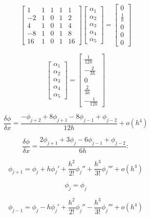 \documentclass[12pt,a4paper]{report}
\begin{document}
\begin{enumerate}
$$\begin{bmatrix}
1 & 1 & 1 & 1 & 1 \\
-2 & 1 & 0 & 1 & 2 \\
4 & 1 & 0 & 1 & 4 \\
-8 & 1 & 0 & 1 & 8 \\
16 & 1 & 0 & 1 & 16
\end{bmatrix}
\begin{bmatrix}
\alpha_1 \\ \alpha_2 \\ \alpha_3 \\ \alpha_4 \\ \alpha_5
\end{bmatrix} = 
\begin{bmatrix}
0 \\ \frac{1}{h} \\ 0 \\ 0 \\ 0
\end{bmatrix}$$

$$\begin{bmatrix}
\alpha_1 \\ \alpha_2 \\ \alpha_3 \\ \alpha_4 \\ \alpha_5
\end{bmatrix} =
\begin{bmatrix}
\frac{1}{12h} \\ -\frac{2}{3h} \\ 0 \\ \frac{2}{3h} \\ -\frac{1}{12h}
\end{bmatrix}$$

$$\frac{\delta\phi}{\delta x} = \frac{-\phi_{j+2} + 8\phi_{j+1} - 8\phi_{j-1} + \phi_{j-2}}{12h} + o\left(h^4\right)$$


\pagebreak

$$\frac{\delta\phi}{\delta x} = \frac{2\phi_{j+1} + 3\phi_j - 6\phi_{j-1} + \phi_{j-2}}{6h}:$$

$$\phi_{j+1} = \phi_j + h{\phi_j}' + \frac{h^2}{2!}{\phi_j}'' + \frac{h^3}{3!}{\phi_j}''' + o\left(h^4\right)$$

$$\phi_j = \phi_j$$

$$\phi_{j-1} = \phi_j - h{\phi_j}' + \frac{h^2}{2!}{\phi_j}'' - \frac{h^3}{3!}{\phi_j}''' + o\left(h^4\right)$$


\end{enumerate}
\end{document}
